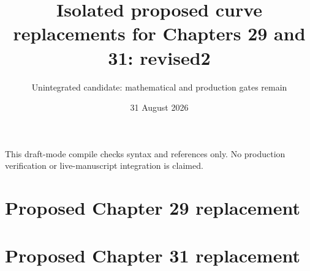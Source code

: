 \documentclass[11pt]{article}
\title{Isolated proposed curve replacements for Chapters 29 and 31: revised2}
\author{Unintegrated candidate: mathematical and production gates remain}
\date{31 August 2026}
\begin{document}
\maketitle
\noindent This draft-mode compile checks syntax and references only.
No production verification or live-manuscript integration is claimed.

\section*{Proposed Chapter 29 replacement}

\section*{Proposed Chapter 31 replacement}



\end{document}
